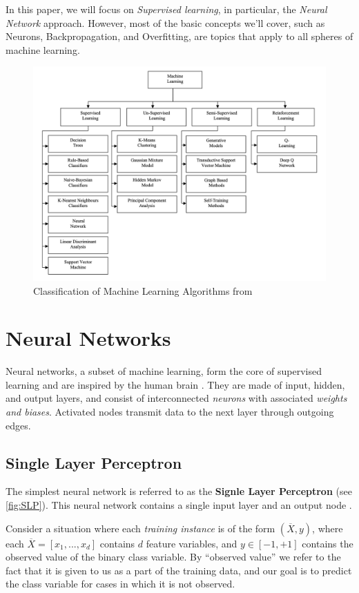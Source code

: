 \documentclass{article}
\begin{document}
In this paper, we will focus on \textit{Supervised learning}, in particular, the \textit{Neural Network} approach. However, most of the basic concepts we'll cover, such as Neurons, Backpropagation, and Overfitting, are topics that apply to all spheres of machine learning. 
\begin{figure}
  \includegraphics{MachineLearning}
  \caption{Classification of Machine Learning Algorithms from \cite{SurveyML}}
  \label{fig:ML}
\end{figure}
\section{Neural Networks}
Neural networks, a subset of machine learning, form the core of supervised learning and are inspired by the human brain \citep{web:IBM:NN}. They are made of input, hidden, and output layers, and consist of interconnected \textit{neurons} with associated \textit{weights and biases}. Activated nodes transmit data to the next layer through outgoing edges.

\subsection{Single Layer Perceptron} \label{sub:Single Layer Perceptron}
The simplest neural network is referred to as the \textbf{Signle Layer Perceptron} (see \autoref{fig:SLP}). This neural network contains
a single input layer and an output node \citep{inbook:Aggarwal-1.2}.

Consider a situation where each \textit{training instance} is of the form $(\overline{X}, y)$, where each $\overline{X} = [x_1,..., x_d]$ contains $d$ feature variables, and $y \in [-1, +1]$ contains the observed value of the binary class variable. By “observed value” we refer to the fact that it is given to us as a part of the training data, and our goal is to predict the class variable for cases in which it is not observed.
\end{document}
